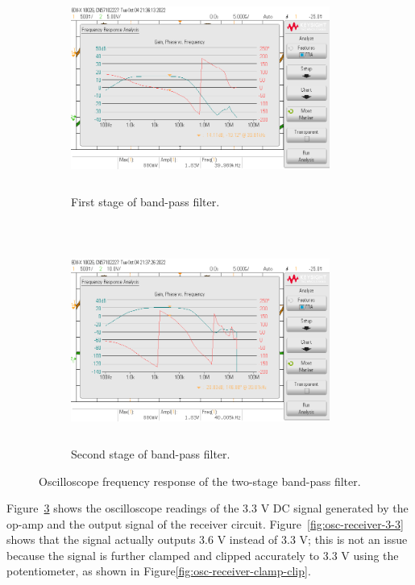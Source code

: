\documentclass[class=report,11pt,crop=false]{standalone}
\begin{document}
\begin{figure}[htbp]
    \centering
    \captionsetup{type=figure}
    \begin{subfigure}[t]{0.5\textwidth}
        \centering
        \def\svgwidth{1\linewidth}
        {\scriptsize
            \includegraphics[width=8.5cm,height=6cm]{../Images/scope_10.png}}
        \caption{First stage of band-pass filter.}
        \label{fig:osc-receiver-bpf-1}
    \end{subfigure}%
    ~ 
    \begin{subfigure}[t]{0.5\textwidth}
        \def\svgwidth{1\linewidth}
        {\scriptsize
            \includegraphics[width=8.5cm,height=6cm]{../Images/scope_12.png}}
        \caption{Second stage of band-pass filter.}
        \label{fig:osc-receiver-bpf-2}
    \end{subfigure}
    \caption{Oscilloscope frequency response of the two-stage band-pass filter.}
    \label{fig:osc-receiver-2}
\end{figure}

Figure~\ref{fig:osc-receiver-2} shows the oscilloscope readings of the 3.3 V DC signal generated by the op-amp and the output signal of the receiver circuit. Figure~\ref{fig:osc-receiver-3-3} shows that the signal actually outputs 3.6 V instead of 3.3 V; this is not an issue because the signal is further clamped and clipped accurately to 3.3 V using the potentiometer, as shown in Figure\ref{fig:osc-receiver-clamp-clip}.
\end{document}
